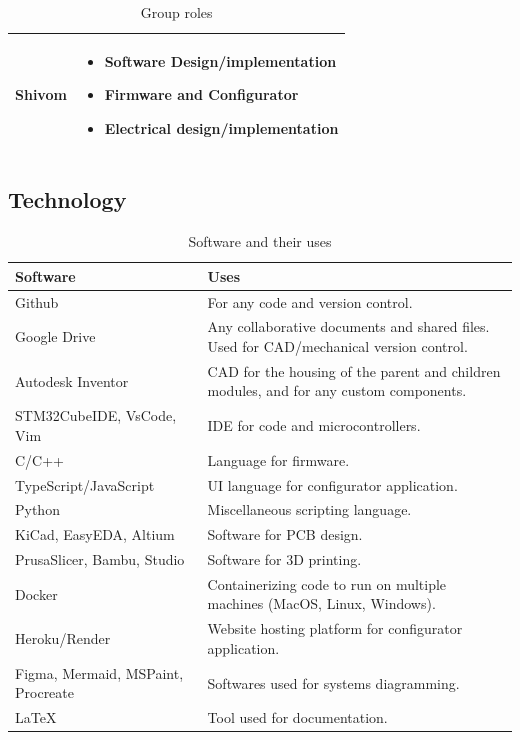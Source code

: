 \documentclass[a4]{article}
\begin{document}
\begin{table}[h!]
\begin{tabularx}{\linewidth}{|Y|Y|}
Shivom &
\begin{minipage}[c]{\linewidth} %
\vspace{2mm}
\begin{itemize}[leftmargin=*, labelsep=3pt]
    \item Software Design/implementation
    \item Firmware and Configurator
    \item Electrical design/implementation
\end{itemize}
\vspace{2mm}
\end{minipage} \\
\hline
\end{tabularx}
\caption{Group roles}
\end{table}

\clearpage
\subsection{Technology}

\begin{table}[h!]
\centering
\renewcommand{\arraystretch}{1.2} %
\centering
\begin{tabularx}{\linewidth}{|Y|Y|}
\hline
\textcolor{McMasterMaroon}{\textbf{Software}} & \textcolor{McMasterMaroon}{\textbf{Uses}} \\
\hline
Github & For any code and version control. \\
\hline
Google Drive & Any collaborative documents and shared files. Used for CAD/mechanical version control. \\
\hline
Autodesk Inventor & CAD for the housing of the parent and children modules, and for any custom components. \\
\hline
STM32CubeIDE, VsCode, Vim & IDE for code and microcontrollers. \\
\hline
C/C++ & Language for firmware. \\
\hline
TypeScript/JavaScript & UI language for configurator application. \\
\hline
Python & Miscellaneous scripting language. \\
\hline
KiCad, EasyEDA, Altium & Software for PCB design. \\
\hline
PrusaSlicer, Bambu, Studio & Software for 3D printing. \\
\hline
Docker & Containerizing code to run on multiple machines (MacOS, Linux, Windows). \\
\hline
Heroku/Render & Website hosting platform for configurator application. \\
\hline
Figma, Mermaid, MSPaint, Procreate & Softwares used for systems diagramming. \\
\hline
LaTeX & Tool used for documentation. \\
\hline
\end{tabularx}
\caption{Software and their uses}
\end{table}
\end{document}
